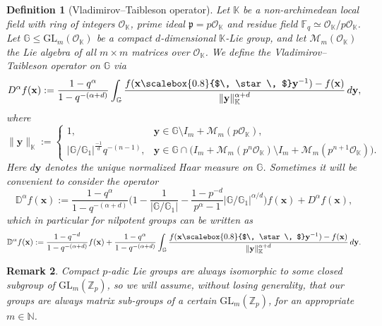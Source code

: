 \documentclass[12pt, reqno]{amsart}
\newtheorem{defi}{Definition}[section]
\newtheorem{rem}[defi]{Remark}
\newcommand{\N}{\mathbb{N}}
\newcommand{\Z}{\mathbb{Z}}
\newcommand{\1}{\mathds{1}}
\newcommand{\G}{\mathbb{G}}
\newcommand{\smallstar}{\scalebox{0.8}{$\, \star \, $}}
\begin{document}
\begin{defi}[Vladimirov–Taibleson operator]\label{defivladimirov}
Let $\mathbb{K}$ be a non-archimedean local field with ring of integers $\mathcal{O}_{\mathbb{K}}$, prime ideal $\mathfrak{p} = p \mathcal{O}_{\mathbb{K}}$ and residue field $\mathbb{F}_q \simeq \mathcal{O}_{\mathbb{K}}/p \mathcal{O}_{\mathbb{K}}$. Let $\mathbb{G} \le \mathrm{GL}_m(\mathcal{O}_{\mathbb{K}})$ be a compact $d$-dimensional $\mathbb{K}$-Lie group, and let $\mathcal{M}_m(\mathcal{O}_{\mathbb{K}})$ the Lie algebra of all $m \times m$ matrices over $\mathcal{O}_{\mathbb{K}}$. We define the Vladimirov–Taibleson operator on $\mathbb{G}$ via
\[
D^\alpha f(\mathbf{x}) := \frac{1 - q^\alpha}{1 - q^{-(\alpha+d)}} \int_{\mathbb{G}} \frac{f(\mathbf{x} \smallstar \mathbf{y}^{-1}) - f(\mathbf{x})}{\|\mathbf{y}\|_{\mathbb{K}}^{\alpha+d}} \, d\mathbf{y},
\]
where
\[
\|\mathbf{y}\|_{\mathbb{K}} :=
\begin{cases}
1, & \mathbf{y} \in \mathbb{G} \setminus I_m + \mathcal{M}_m(p\mathcal{O}_{\mathbb{K}}),\\
|\G / \G_1|^{\frac{-1}{d}}q^{-(n-1)}, & \mathbf{y} \in  \G \cap \big( I_m + \mathcal{M}_m(p^n \mathcal{O}_{\mathbb{K}}) \setminus I_m + \mathcal{M}_m(p^{n+1} \mathcal{O}_{\mathbb{K}}) \big).
\end{cases}
\]Here $d\mathbf{y}$ denotes the unique normalized Haar measure on $\mathbb{G}$. Sometimes it will be convenient to consider the operator
\[
\mathbb{D}^\alpha f(\mathbf{x}) := \frac{1 - q^{\alpha}}{1 - q^{-(\alpha+d)}} \Big( 1 - \frac{1}{|\G/\G_1|} - \frac{1-p^{-d}}{p^\alpha -1 } |\G / \G_1|^{\alpha/d} \Big) f(\mathbf{x}) + D^\alpha f (\mathbf{x}),
\]which in particular for nilpotent groups can be written as \[
\mathbb{D}^\alpha f(\mathbf{x}) := \frac{1 - q^{-d}}{1 - q^{-(\alpha+d)}} f(\mathbf{x}) + \frac{1 - q^\alpha}{1 - q^{-(\alpha+d)}} \int_{\mathbb{G}} \frac{f(\mathbf{x} \smallstar \mathbf{y}^{-1}) - f(\mathbf{x})}{\|\mathbf{y}\|_{\mathbb{K}}^{\alpha+d}} \, d\mathbf{y}.
\]
\end{defi}

\begin{rem}
    Compact $p$-adic Lie groups are always isomorphic to some closed subgroup of $\mathrm{GL}_m (\Z_p)$, so we will assume, without losing generality, that our groups are always matrix sub-groups of a certain $\mathrm{GL}_m (\Z_p)$, for an appropriate $m \in \N$.  
\end{rem}
\end{document}
